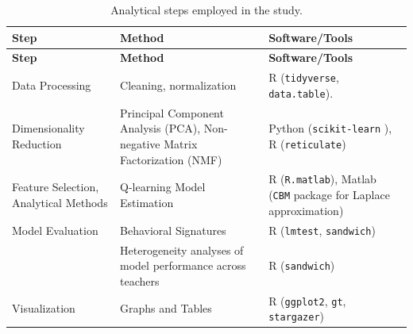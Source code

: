 \documentclass[
  number,
  preprint,
  3p,
  onecolumn]{elsarticle}
\begin{document}
\begin{longtable}[]{@{}
  >{\raggedright\arraybackslash}p{}
  >{\raggedright\arraybackslash}p{}
  >{\raggedright\arraybackslash}p{}@{}}
\caption{Analytical steps employed in the
study.}\label{tbl-methods}\tabularnewline
\toprule\noalign{}
\begin{minipage}[b]{\linewidth}\raggedright
\textbf{Step}
\end{minipage} & \begin{minipage}[b]{\linewidth}\raggedright
\textbf{Method}
\end{minipage} & \begin{minipage}[b]{\linewidth}\raggedright
\textbf{Software/Tools}
\end{minipage} \\
\midrule\noalign{}
\endfirsthead
\toprule\noalign{}
\begin{minipage}[b]{\linewidth}\raggedright
\textbf{Step}
\end{minipage} & \begin{minipage}[b]{\linewidth}\raggedright
\textbf{Method}
\end{minipage} & \begin{minipage}[b]{\linewidth}\raggedright
\textbf{Software/Tools}
\end{minipage} \\
\midrule\noalign{}
\endhead
\bottomrule\noalign{}
\endlastfoot
Data Processing & Cleaning, normalization & R \citep{rcoreteam2024}
(\texttt{tidyverse}, \texttt{data.table}). \\
Dimensionality Reduction & Principal Component Analysis (PCA),
Non-negative Matrix Factorization (NMF) & Python (\texttt{scikit-learn}
\citep{pedregosa2011}), R (\texttt{reticulate}) \\
Feature Selection, Analytical Methods & Q-learning Model Estimation & R
(\texttt{R.matlab}), Matlab (\texttt{CBM} package for Laplace
approximation) \citep{piray2019} \\
Model Evaluation & Behavioral Signatures & R (\texttt{lmtest},
\texttt{sandwich}) \\
& Heterogeneity analyses of model performance across teachers & R
(\texttt{sandwich}) \\
Visualization & Graphs and Tables & R (\texttt{ggplot2}, \texttt{gt},
\texttt{stargazer}) \\
\end{longtable}
\end{document}
